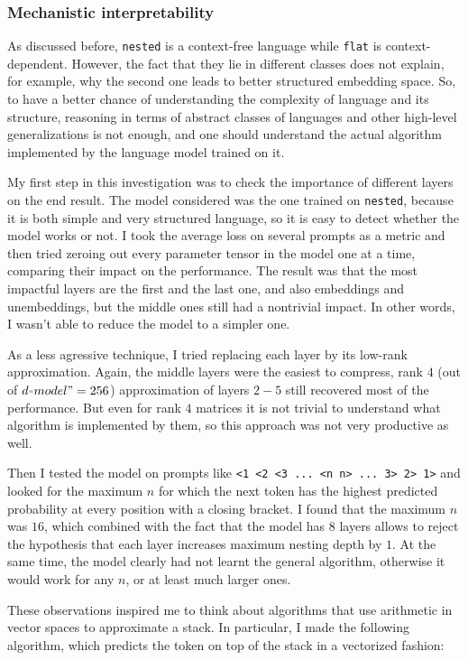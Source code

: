 \documentclass[a4paper, 11pt, oneside]{article}
\begin{document}
	\subsubsection{Mechanistic interpretability}
	As discussed before, \texttt{nested} is a context-free language while \texttt{flat}
	is context-dependent. However, the fact that they lie in different classes does
	not explain, for example, why the second one leads to better structured embedding
	space. So, to have a better chance of understanding the complexity of language
	and its structure, reasoning in terms of abstract classes of languages and
	other high-level generalizations is not enough, and one should understand the actual
	algorithm implemented by the language model trained on it.

	My first step in this investigation was to check the importance of different layers
	on the end result. The model considered was the one trained on \texttt{nested},
	because it is both simple and very structured language, so it is easy to detect
	whether the model works or not. I took the average loss on several prompts as
	a metric and then tried zeroing out every parameter tensor in the model one at
	a time, comparing their impact on the performance. The result was that the
	most impactful layers are the first and the last one, and also embeddings and unembeddings,
	but the middle ones still had a nontrivial impact. In other words, I wasn't
	able to reduce the model to a simpler one.

	As a less agressive technique, I tried replacing each layer by its low-rank approximation.
	Again, the middle layers were the easiest to compress, rank $4$ (out of $d_{"}m
	odel" = 256$) approximation of layers $2 - 5$ still recovered most of the
	performance. But even for rank $4$ matrices it is not trivial to understand what
	algorithm is implemented by them, so this approach was not very productive as
	well.

	Then I tested the model on prompts like \verb|<1 <2 <3 ... <n n> ... 3> 2> 1>|
	and looked for the maximum $n$ for which the next token has the highest
	predicted probability at every position with a closing bracket. I found that the
	maximum $n$ was $16$, which combined with the fact that the model has $8$
	layers allows to reject the hypothesis that each layer increases maximum
	nesting depth by $1$. At the same time, the model clearly had not learnt the
	general algorithm, otherwise it would work for any $n$, or at least much
	larger ones.

	These observations inspired me to think about algorithms that use arithmetic
	in vector spaces to approximate a stack. In particular, I made the following
	algorithm, which predicts the token on top of the stack in a vectorized fashion:
\end{document}
